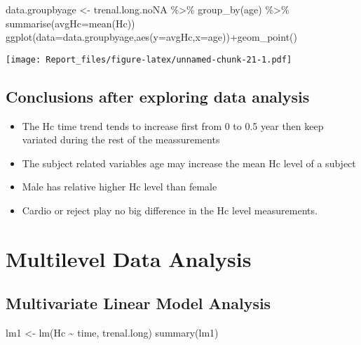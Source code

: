 \documentclass[
]{article}
\newenvironment{Shaded}{\begin{snugshade}}{\end{snugshade}}
\newcommand{\AttributeTok}[1]{\textcolor[rgb]{0.77,0.63,0.00}{#1}}
\newcommand{\FunctionTok}[1]{\textcolor[rgb]{0.00,0.00,0.00}{#1}}
\newcommand{\NormalTok}[1]{#1}
\newcommand{\OtherTok}[1]{\textcolor[rgb]{0.56,0.35,0.01}{#1}}
\newcommand{\SpecialCharTok}[1]{\textcolor[rgb]{0.00,0.00,0.00}{#1}}
\providecommand{\tightlist}{%
  \setlength{\itemsep}{0pt}\setlength{\parskip}{0pt}}
\begin{document}
\begin{Shaded}
\begin{Highlighting}[]
\NormalTok{data.groupbyage }\OtherTok{\textless{}{-}}\NormalTok{ trenal.long.noNA }\SpecialCharTok{\%\textgreater{}\%}   \FunctionTok{group\_by}\NormalTok{(age) }\SpecialCharTok{\%\textgreater{}\%} \FunctionTok{summarise}\NormalTok{(}\AttributeTok{avgHc=}\FunctionTok{mean}\NormalTok{(Hc))}
\FunctionTok{ggplot}\NormalTok{(}\AttributeTok{data=}\NormalTok{data.groupbyage,}\FunctionTok{aes}\NormalTok{(}\AttributeTok{y=}\NormalTok{avgHc,}\AttributeTok{x=}\NormalTok{age))}\SpecialCharTok{+}\FunctionTok{geom\_point}\NormalTok{()}
\end{Highlighting}
\end{Shaded}

\texttt{[image: Report\_files/figure-latex/unnamed-chunk-21-1.pdf]}

\hypertarget{conclusions-after-exploring-data-analysis}{%
\subsection{Conclusions after exploring data
analysis}\label{conclusions-after-exploring-data-analysis}}

\begin{itemize}
\tightlist
\item
  The Hc time trend tends to increase first from 0 to 0.5 year then keep
  variated during the rest of the meassurements
\item
  The subject related variables age may increase the mean Hc level of a
  subject
\item
  Male has relative higher Hc level than female
\item
  Cardio or reject play no big difference in the Hc level measurements.
\end{itemize}

\hypertarget{multilevel-data-analysis}{%
\section{Multilevel Data Analysis}\label{multilevel-data-analysis}}

\hypertarget{multivariate-linear-model-analysis}{%
\subsection{Multivariate Linear Model
Analysis}\label{multivariate-linear-model-analysis}}

\begin{Shaded}
\begin{Highlighting}[]
\NormalTok{lm1 }\OtherTok{\textless{}{-}} \FunctionTok{lm}\NormalTok{(Hc }\SpecialCharTok{\textasciitilde{}}\NormalTok{ time, trenal.long)}
\FunctionTok{summary}\NormalTok{(lm1)}
\end{Highlighting}
\end{Shaded}
\end{document}
